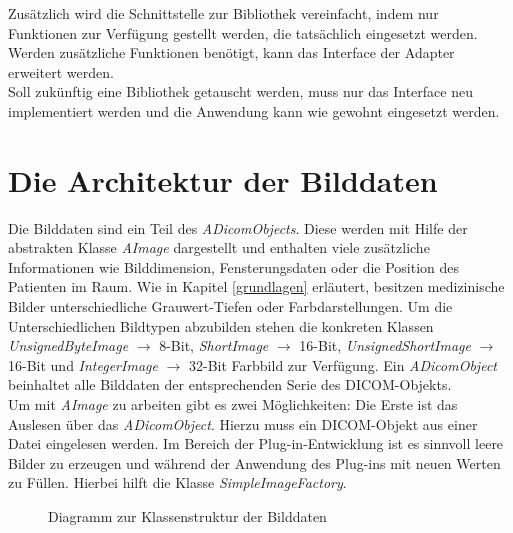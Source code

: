 Zusätzlich wird die Schnittstelle zur Bibliothek vereinfacht, indem nur Funktionen zur Verfügung gestellt werden, die tatsächlich eingesetzt werden. Werden zusätzliche Funktionen benötigt, kann das Interface der Adapter erweitert werden.\\
Soll zukünftig eine Bibliothek getauscht werden, muss nur das Interface neu implementiert werden und die Anwendung kann wie gewohnt eingesetzt werden.

\section{Die Architektur der Bilddaten}

Die Bilddaten sind ein Teil des \textit{ADicomObjects}. Diese werden mit Hilfe der abstrakten Klasse \textit{AImage} dargestellt und enthalten viele zusätzliche Informationen wie Bilddimension, Fensterungsdaten oder die Position des Patienten im Raum. Wie in Kapitel \ref{grundlagen} erläutert, besitzen medizinische Bilder unterschiedliche Grauwert-Tiefen oder Farbdarstellungen. Um die Unterschiedlichen Bildtypen abzubilden stehen die konkreten Klassen \textit{UnsignedByteImage} $\rightarrow$ 8-Bit, \textit{ShortImage} $\rightarrow$ 16-Bit, \textit{UnsignedShortImage} $\rightarrow$ 16-Bit und \textit{IntegerImage} $\rightarrow$ 32-Bit Farbbild zur Verfügung. Ein \textit{ADicomObject} beinhaltet alle Bilddaten der entsprechenden Serie des DICOM-Objekts.\\
Um mit \textit{AImage} zu arbeiten gibt es zwei Möglichkeiten: Die Erste ist das Auslesen über das \textit{ADicomObject}. Hierzu muss ein DICOM-Objekt aus einer Datei eingelesen werden. Im Bereich der Plug-in-Entwicklung ist es sinnvoll leere Bilder zu erzeugen und während der Anwendung des Plug-ins mit neuen Werten zu Füllen. Hierbei hilft die Klasse \textit{SimpleImageFactory}.

\begin{figure}[htbp]
  \vspace{0.5cm}
  \centering
  \caption{Diagramm zur Klassenstruktur der Bilddaten}
  \label{imagemodel}
  \vspace{0.5cm}
\end{figure}

